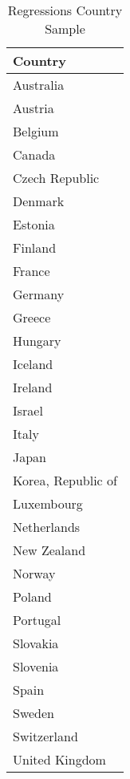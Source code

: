 \begin{table}[ht]
\centering
\caption{Regressions Country Sample} 
\label{country_sample}
{\footnotesize
\begin{tabular}{l}
  \hline
Country \\ 
  \hline
Australia \\ 
  Austria \\ 
  Belgium \\ 
  Canada \\ 
  Czech Republic \\ 
  Denmark \\ 
  Estonia \\ 
  Finland \\ 
  France \\ 
  Germany \\ 
  Greece \\ 
  Hungary \\ 
  Iceland \\ 
  Ireland \\ 
  Israel \\ 
  Italy \\ 
  Japan \\ 
  Korea, Republic of \\ 
  Luxembourg \\ 
  Netherlands \\ 
  New Zealand \\ 
  Norway \\ 
  Poland \\ 
  Portugal \\ 
  Slovakia \\ 
  Slovenia \\ 
  Spain \\ 
  Sweden \\ 
  Switzerland \\ 
  United Kingdom \\ 
   \hline
\end{tabular}
}
\end{table}

